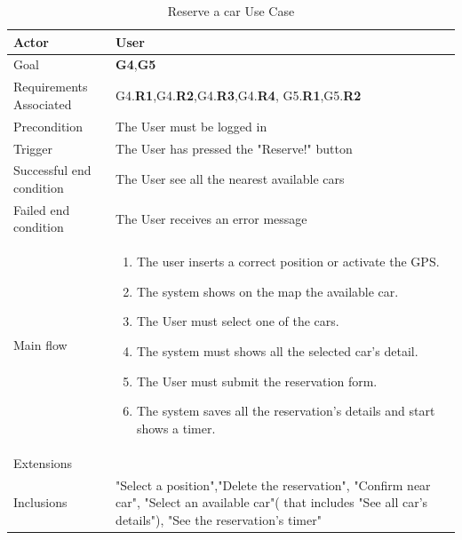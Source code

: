 \newline
\begin{table}[htb]
\begin{center}
\renewcommand{\arraystretch}{1.5}
\begin{tabular}{|l|p{}|}
\hline
Actor & User \\ \hline
Goal & \textbf{G4},\textbf{G5} \\ \hline
Requirements Associated & G4.\textbf{R1},G4.\textbf{R2},G4.\textbf{R3},G4.\textbf{R4}, G5.\textbf{R1},G5.\textbf{R2} \\ \hline
Precondition & The User must be logged in \\ \hline
Trigger & The User has pressed the "Reserve!" button \\ \hline
Successful end condition & The User see all the nearest available cars \\ \hline
Failed end condition & The User receives an error message \\ \hline
Main flow & \begin{minipage}[t]{0.6\textwidth}
\begin{enumerate}
\addtolength{\itemindent}{0.5cm}
\item The user inserts a correct position or activate the GPS.
\item The system shows on the map the available car.
\item The User must select one of the cars.
\item The system must shows all the selected car's detail.
\item The User must submit the reservation form.
\item The system saves all the reservation's details and start shows a timer. 
\vspace{2,5mm}
\end{enumerate}
\end{minipage} \\ \hline
Extensions & \\ \hline
Inclusions & "Select a position","Delete the reservation", "Confirm near car", "Select an available car"( that includes "See all car's details"), "See the reservation's timer" \\ \hline
\end{tabular}
\caption{Reserve a car Use Case}
\end{center}
\end{table}
\clearpage

